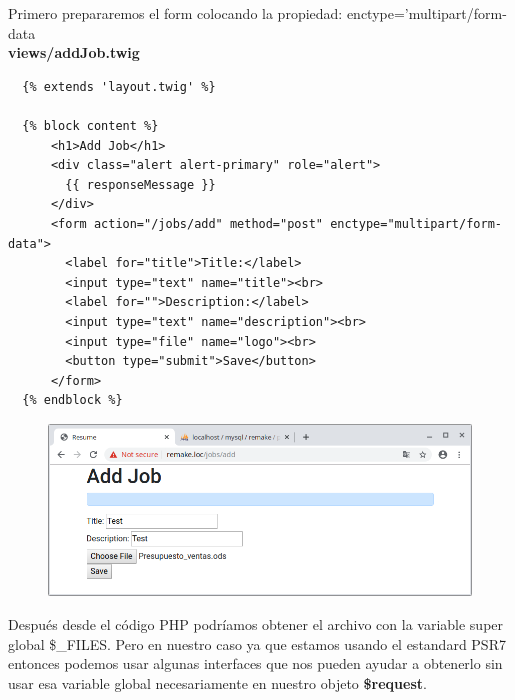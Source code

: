 \documentclass{article}
\begin{document}
Primero prepararemos el form colocando la propiedad:
enctype='multipart/form-data\\

\textbf{views/addJob.twig}
\begin{verbatim}
  {% extends 'layout.twig' %}

  {% block content %}
      <h1>Add Job</h1>
      <div class="alert alert-primary" role="alert">
        {{ responseMessage }}
      </div>
      <form action="/jobs/add" method="post" enctype="multipart/form-data">
        <label for="title">Title:</label>
        <input type="text" name="title"><br>
        <label for="">Description:</label>
        <input type="text" name="description"><br>
        <input type="file" name="logo"><br>
        <button type="submit">Save</button>
      </form>
  {% endblock %}
\end{verbatim}

\begin{figure}[h!]
  \centering
  \includegraphics[scale=0.5]{./Pictures/176_archivo_formulario.png}
\end{figure}

Después desde el código PHP podríamos obtener el archivo con la variable super
global \$\_FILES. Pero en nuestro caso ya que estamos usando el estandard PSR7
entonces podemos usar algunas interfaces que nos pueden ayudar a obtenerlo sin
usar esa variable global necesariamente en nuestro objeto \textbf{\$request}.\\
\end{document}
